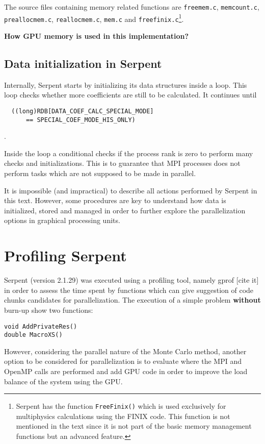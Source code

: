 \documentclass[twoside,a4paper,12pt,english,draft]{anstrans}
\begin{document}
The source files containing memory related functions are \texttt{freemem.c},
\texttt{memcount.c}, \texttt{preallocmem.c}, \texttt{reallocmem.c}, \texttt{mem.c}
and \texttt{freefinix.c}\footnote{Serpent has the function \texttt{FreeFinix()} which
  is used exclusively for multiphysics calculations using the FINIX code. This function
  is not mentioned in the text since it is not part of the basic memory management functions
  but an advanced feature.}.


\textbf{How GPU memory is used in this implementation?}

\subsection{Data initialization in Serpent}
Internally, Serpent starts by initializing its data structures inside a loop. This loop checks
whether more coefficients are still to be calculated. It continues until \begin{verbatim}
  ((long)RDB[DATA_COEF_CALC_SPECIAL_MODE]
      == SPECIAL_COEF_MODE_HIS_ONLY)
\end{verbatim}.

Inside the loop a conditional checks if the process rank is zero to perform many checks and initializations.
This is to guarantee that MPI processes does not perform tasks which are not supposed to be made in parallel.

It is impossible (and impractical) to describe all actions performed by Serpent in this text. However, some
procedures are key to understand how data is initialized, stored and managed in order to further explore
the parallelization options in graphical processing units.

\section{Profiling Serpent}

Serpent (version 2.1.29) was executed using a profiling tool, namely gprof [cite it] in order
to assess the time spent by functions which can give suggestion of code chunks candidates for
parallelization. The execution of a simple problem \textbf{without} burn-up show two functions:
\begin{verbatim}
void AddPrivateRes()
double MacroXS()
\end{verbatim}
However, considering the parallel nature of the Monte Carlo method, another option to be considered
for parallelization is to evaluate where the MPI and OpenMP calls are performed and add GPU code
in order to improve the load balance of the system using the GPU.
\end{document}
